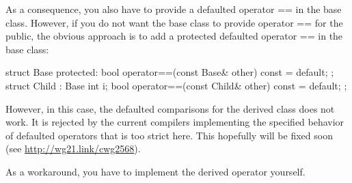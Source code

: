 As a consequence, you also have to provide a defaulted operator == in the base class. However, if you do not want the base class to provide operator == for the public, the obvious approach is to add a protected defaulted operator == in the base class:

\begin{cpp}
struct Base {
	protected:
	bool operator==(const Base& other) const = default;
};
struct 
Child : Base {
	int i;
	bool operator==(const Child& other) const = default;
};
\end{cpp}

However, in this case, the defaulted comparisons for the derived class does not work. It is rejected by the current compilers implementing the specified behavior of defaulted operators that is too strict here. This hopefully will be fixed soon (see \url{http://wg21.link/cwg2568}).

As a workaround, you have to implement the derived operator yourself.





